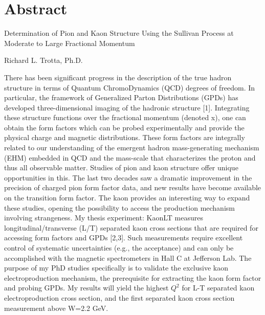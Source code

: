 \chapter[Abstract]{Abstract}

\begin{center}
Determination of Pion and Kaon Structure Using the Sullivan Process at Moderate to Large Fractional Momentum

Richard L. Trotta, Ph.D.
\end{center}

There has been significant progress in the description of the true hadron structure in terms of Quantum ChromoDynamics (QCD) degrees of freedom. In particular, the framework of Generalized Parton Distributions (GPDs) has developed three-dimensional imaging of the hadronic structure [1]. Integrating these structure functions over the fractional momentum (denoted x), one can obtain the form factors which can be probed experimentally and provide the physical charge and magnetic distributions. These form factors are integrally related to our understanding of the emergent hadron mass-generating mechanism (EHM) embedded in QCD and the mass-scale that characterizes the proton and thus all observable matter. Studies of pion and kaon structure offer unique opportunities in this. The last two decades saw a dramatic improvement in the precision of charged pion form factor data, and new results have become available on the transition form factor. The kaon provides an interesting way to expand these studies, opening the possibility to access the production mechanism involving strangeness. My thesis experiment: KaonLT measures longitudinal/transverse (L/T) separated kaon cross sections that are required for accessing form factors and GPDs [2,3]. Such measurements require excellent control of systematic uncertainties (e.g., the acceptance) and can only be accomplished with the magnetic spectrometers in Hall C at Jefferson Lab. The purpose of my PhD studies specifically is to validate the exclusive kaon electroproduction mechanism, the prerequisite for extracting the kaon form factor and probing GPDs. My results will yield the highest $Q^2$ for L-T separated kaon electroproduction cross section, and the first separated kaon cross section measurement above W=2.2 GeV.
